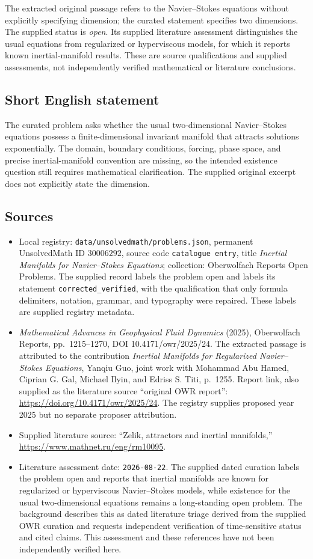 \documentclass[11pt]{article}
\begin{document}
The extracted original passage refers to the Navier--Stokes equations without explicitly specifying dimension; the curated statement specifies two dimensions. The supplied status is \emph{open}. Its supplied literature assessment distinguishes the usual equations from regularized or hyperviscous models, for which it reports known inertial-manifold results. These are source qualifications and supplied assessments, not independently verified mathematical or literature conclusions.
\subsection{Short English statement}
The curated problem asks whether the usual two-dimensional Navier--Stokes equations possess a finite-dimensional invariant manifold that attracts solutions exponentially. The domain, boundary conditions, forcing, phase space, and precise inertial-manifold convention are missing, so the intended existence question still requires mathematical clarification. The supplied original excerpt does not explicitly state the dimension.
\subsection{Sources}
\begin{itemize}
\item Local registry: \texttt{data/unsolvedmath/problems.json}, permanent UnsolvedMath ID \(30006292\), source code \texttt{catalogue entry}, title \emph{Inertial Manifolds for Navier--Stokes Equations}; collection: Oberwolfach Reports Open Problems. The supplied record labels the problem open and labels its statement \texttt{corrected\_verified}, with the qualification that only formula delimiters, notation, grammar, and typography were repaired. These labels are supplied registry metadata.
\item \emph{Mathematical Advances in Geophysical Fluid Dynamics} (2025), Oberwolfach Reports, pp.\ 1215--1270, DOI 10.4171/owr/2025/24. The extracted passage is attributed to the contribution \emph{Inertial Manifolds for Regularized Navier--Stokes Equations}, Yanqiu Guo, joint work with Mohammad Abu Hamed, Ciprian G. Gal, Michael Ilyin, and Edriss S. Titi, p.\ 1255. Report link, also supplied as the literature source ``original OWR report'': \url{https://doi.org/10.4171/owr/2025/24}. The registry supplies proposed year 2025 but no separate proposer attribution.
\item Supplied literature source: ``Zelik, attractors and inertial manifolds,'' \url{https://www.mathnet.ru/eng/rm10095}.
\item Literature assessment date: \texttt{2026-08-22}. The supplied dated curation labels the problem open and reports that inertial manifolds are known for regularized or hyperviscous Navier--Stokes models, while existence for the usual two-dimensional equations remains a long-standing open problem. The background describes this as dated literature triage derived from the supplied OWR curation and requests independent verification of time-sensitive status and cited claims. This assessment and these references have not been independently verified here.
\end{itemize}
\end{document}
